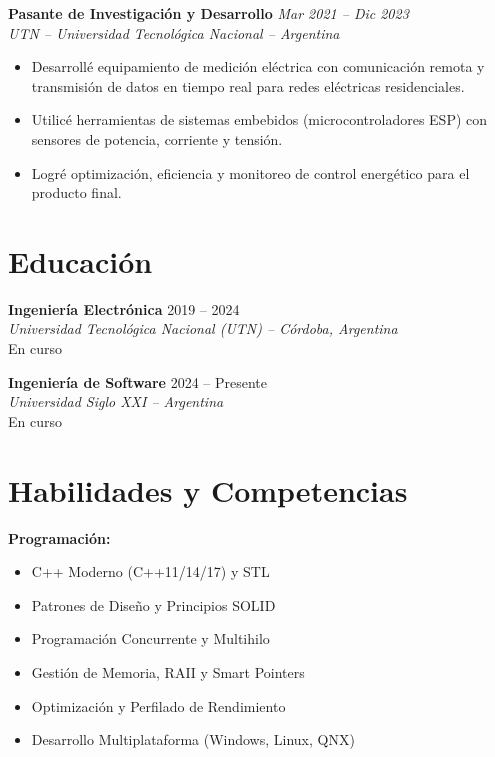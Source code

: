 \documentclass[11pt,a4paper]{article}
\newcommand{\resumeItem}[1]{\item #1}
\newcommand{\jobentry}[3]{%
    \noindent\textbf{#1} \hfill \textit{#2}\\
    \textit{#3}
}
\begin{document}
\vspace{6pt}

\jobentry{Pasante de Investigaci\'{o}n y Desarrollo}{Mar 2021 -- Dic 2023}{UTN -- Universidad Tecnol\'{o}gica Nacional -- Argentina}
\begin{itemize}[leftmargin=*, nosep, topsep=4pt]
    \resumeItem{Desarroll\'{e} equipamiento de medici\'{o}n el\'{e}ctrica con comunicaci\'{o}n remota y transmisi\'{o}n de datos en tiempo real para redes el\'{e}ctricas residenciales.}
    \resumeItem{Utilic\'{e} herramientas de sistemas embebidos (microcontroladores ESP) con sensores de potencia, corriente y tensi\'{o}n.}
    \resumeItem{Logr\'{e} optimizaci\'{o}n, eficiencia y monitoreo de control energ\'{e}tico para el producto final.}
\end{itemize}

\section{Educaci\'{o}n}

\noindent\textbf{Ingenier\'{i}a Electr\'{o}nica} \hfill 2019 -- 2024\\
\textit{Universidad Tecnol\'{o}gica Nacional (UTN) -- C\'{o}rdoba, Argentina}\\
En curso

\vspace{6pt}

\noindent\textbf{Ingenier\'{i}a de Software} \hfill 2024 -- Presente\\
\textit{Universidad Siglo XXI -- Argentina}\\
En curso

\section{Habilidades y Competencias}

\noindent\textbf{Programaci\'{o}n:}
\begin{itemize}[leftmargin=*, nosep, topsep=2pt]
    \item C++ Moderno (C++11/14/17) y STL
    \item Patrones de Dise\~{n}o y Principios SOLID
    \item Programaci\'{o}n Concurrente y Multihilo
    \item Gesti\'{o}n de Memoria, RAII y Smart Pointers
    \item Optimizaci\'{o}n y Perfilado de Rendimiento
    \item Desarrollo Multiplataforma (Windows, Linux, QNX)
\end{itemize}
\end{document}

